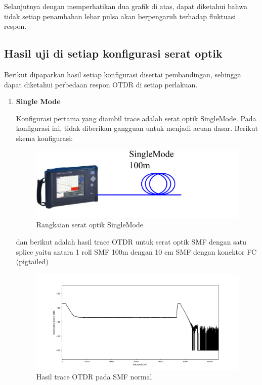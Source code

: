 \documentclass[12pt]{article}
\begin{document}
	Selanjutnya dengan memperhatikan dua grafik di atas, dapat diketahui bahwa tidak setiap penambahan lebar pulsa akan berpengaruh terhadap fluktuasi respon.
	
	\newpage
	\subsection{Hasil uji di setiap konfigurasi serat optik}
	
	Berikut dipaparkan hasil setiap konfigurasi disertai pembandingan, sehingga dapat diketahui perbedaan respon OTDR di setiap perlakuan.
	
	\begin{enumerate}
		\item \textbf{Single Mode}

		Konfigurasi pertama yang diambil trace adalah serat optik SingleMode.
		Pada konfigurasi ini, tidak diberikan gangguan untuk menjadi acuan dasar.
		Berikut skema konfigurasi:
		
		\begin{figure}[!h]
			\centering
			\captionsetup{justification=centering}
			\includegraphics[width=0.6\linewidth]{images/Bab_4/s_basic}
			\caption[Trace SMF-SMF]{\small{Rangkaian serat optik SingleMode}}
		\end{figure}
	
		dan berikut adalah hasil trace OTDR untuk serat optik SMF dengan satu splice yaitu antara 1 roll SMF 100m dengan 10 cm SMF dengan konektor FC (pigtailed)
		
		\begin{figure}[!h]
			\centering
			\captionsetup{justification=centering}
			\includegraphics[width=\linewidth]{images/Bab_4/Bab_4_3a1}
			\caption[Trace SMF]{\small{Hasil trace OTDR pada SMF normal}}
		\end{figure}
	

\end{enumerate}
\end{document}
